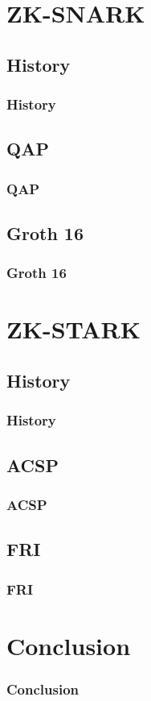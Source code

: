 \documentclass{beamer}
\begin{document}
\section{ZK-SNARK}
\subsection{History}
\frame
{
  \frametitle{History}
}
\subsection{QAP}
\frame
{
  \frametitle{QAP}
}
\subsection{Groth 16}
\frame
{
  \frametitle{Groth 16}
}
\section{ZK-STARK}
\subsection{History}
\frame
{
  \frametitle{History}
}
\subsection{ACSP}
\frame
{
  \frametitle{ACSP}
}
\subsection{FRI}
\frame
{
  \frametitle{FRI}
}

\section{Conclusion}
\frame
{
  \frametitle{Conclusion}
}
\end{document}
